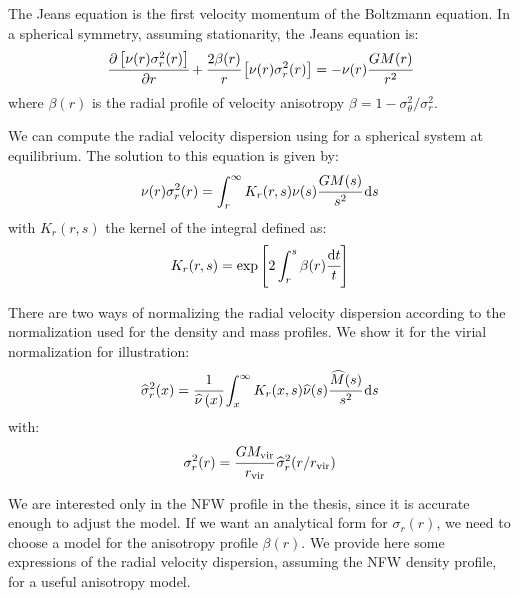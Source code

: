 The Jeans equation is the first velocity momentum of the Boltzmann equation. In a
spherical symmetry, assuming stationarity, the Jeans equation is:
%
\begin{equation}
    \label{eq:jeans}
    \cfrac{{\partial} \left[\nu(r)\sigma_r^2(r)\right]}{{\partial} r} +
    \cfrac{2\beta(r)}{r}\left[\nu(r)\sigma_r^2(r)\right]=
    -\nu(r)\cfrac{GM(r)}{r^2}
\end{equation}
%
where $\beta \left(r\right)$ is the radial profile of velocity anisotropy
$\beta = 1 - \sigma_\theta^2/\sigma_r^2$.

We can compute the radial velocity dispersion using  for
a spherical system at equilibrium. The solution to this equation is given by:
%
\begin{equation}
    \nu(r)\sigma_r^2(r)=
    \int_r^\infty K_r(r,s)\nu(s)\cfrac{GM(s)}{s^2}\,{\rm{d}}{s}
\end{equation}
%
with $K_r(r,s)$ the kernel of the integral defined as:
%
\begin{equation}
    K_r(r,s)=\exp\left[2\int_r^s\beta(r)\cfrac{{\rm{d}}{t}}{t}\right]
\end{equation}

There are two ways of normalizing the radial velocity dispersion according to
the normalization used for the density and mass profiles. We show it for the
virial normalization for illustration:
%
\begin{equation}
    \label{eq:sigma_norm}
    \widehat\sigma_r^2(x)= \cfrac{1}{\widehat\nu \left(x\right)}
    \int_x^\infty K_r(x,s)\widehat\nu(s)\cfrac{\widehat{M}(s)}{s^2}\,{\rm{d}} s
\end{equation}
%
with:
%
\begin{equation}
    \sigma_r^2(r) = \cfrac{GM_{\rm vir}}{r_{\rm vir}}\,\widehat\sigma_r^2(r/r_{\rm vir})
\end{equation}

We are interested only in the NFW profile in the thesis, since it is accurate
enough to adjust the model. If we want an analytical form for $\sigma_r
\left(r\right)$, we need to choose a model for the anisotropy profile $\beta
\left(r\right)$. We provide here some expressions of the radial velocity
dispersion, assuming the NFW density profile, for a useful anisotropy model.

\subsection{\citet{ML+05}}
\label{sub:ml05}

